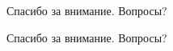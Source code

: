 \documentclass{beamer}
\begin{document}
\begin{comment}
\begin{frame}{Характеристика реализации}
 
\begin{tabular}{| l | c | } 
\hline
  Язык программирования & C, Python\\ \hline
  Операционная система &  Linux \\ \hline  
  Кол-во строк кода & n \\ 
\hline
\end{tabular}
\end{frame}

\begin{frame}{Результаты}

\begin{block}{Результаты}
\begin{itemize}
 \item Проведен обзор и сравнительный анализ средств построения моделей нормального поведения приложений.
 \item Разработан метод автоматизированного построения нормального поведения приложений для ОС Linux и языка Си.
 \item Реализовано средство для приложений, написанных для ОС Linux на языке Си, позволяющие разбивать программу на набор блоков.
 \item Проведено испытание реализованного средства на уязвимом приложений.
\end{itemize}
\end{block}
\end{frame}
\end{comment}



  \begin{frame}{Спасибо за внимание. Вопросы?}
\begin{center}
\LARGE{Спасибо за внимание. Вопросы?}
\end{center}

   
  \end{frame}
 
\end{document}
